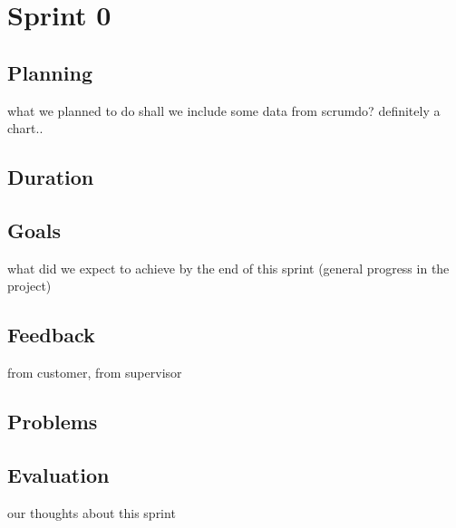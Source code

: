 
\chapter{Sprint 0} %

\label{Sprint 0} %



\section{Planning}
what we planned to do
shall we include some data from scrumdo? definitely a chart..
\section{Duration}
\section{Goals}
what did we expect to achieve by the end of this sprint (general progress in the project)
\section{Feedback}
from customer, from supervisor
\section{Problems}

\section{Evaluation}
our thoughts about this sprint
